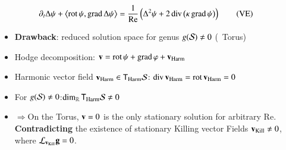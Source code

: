 \documentclass[15pt,t,aspectratio=1610]{beamer}
\begin{document}
  \begin{frame}
        \begin{align}
          \partial_{t}\Delta\psi + \left\langle \operatorname{rot}\psi , \operatorname{grad}\Delta\psi \right\rangle &= \frac{1}{\text{Re}}\left( \Delta^{2}\psi + 2\operatorname{div}\left( \kappa\operatorname{grad}\psi \right) \right)
          \tag{VE}
        \end{align}
    \begin{itemize}
      \item \textbf{Drawback}: reduced solution space for genus \( g(\mathcal{S})\ne 0 \)  (\eg\ Torus)
      \item Hodge decomposition:\quad
            \( \mathbf{v} = \operatorname{rot}\psi + \operatorname{grad}\varphi + \mathbf{v}_{\text{Harm}}  \)
      \item Harmonic vector field \( \mathbf{v}_{\text{Harm}}\in\mathsf{T}_{\text{Harm}}\mathcal{S} \):\quad
            \( \operatorname{div}\mathbf{v}_{\text{Harm}} = \operatorname{rot}\mathbf{v}_{\text{Harm}} = 0 \)
      \item For \( g(\mathcal{S})\ne 0 \):\quad \( \operatorname{dim}_{\mathbb{R}}\mathsf{T}_{\text{Harm}}\mathcal{S} \ne 0 \)
      \item \( \Rightarrow \)\quad On the Torus, \( \mathbf{v}=0 \) is the only stationary solution for arbitrary \( \text{Re} \).
            \quad \textbf{Contradicting} the existence of stationary Killing vector Fields \( \mathbf{v}_{\text{Kill}}\ne 0 \), where \( \mathcal{L}_{\mathbf{v}_{\text{Kill}}}\mathbf{g} = 0 \). 
    \end{itemize}
  \end{frame}
\end{document}
